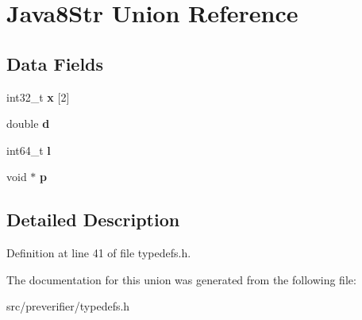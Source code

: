 \section{Java8Str Union Reference}
\label{union_java8_str}
\subsection*{Data Fields}
\begin{DoxyCompactItemize}
\item 
int32\_\-t {\bfseries x} [2]\label{union_java8_str_ac81f4bb0d53e0e93517d76640361cba2}

\item 
double {\bfseries d}\label{union_java8_str_a1cecdb497958a23d3a2fd04f9f151e81}

\item 
int64\_\-t {\bfseries l}\label{union_java8_str_ad4ef98004ad01790cbf2134135d1f200}

\item 
void $\ast$ {\bfseries p}\label{union_java8_str_a19126cd2e6922e76791748db857500c5}

\end{DoxyCompactItemize}


\subsection{Detailed Description}


Definition at line 41 of file typedefs.h.



The documentation for this union was generated from the following file:\begin{DoxyCompactItemize}
\item 
src/preverifier/typedefs.h\end{DoxyCompactItemize}
